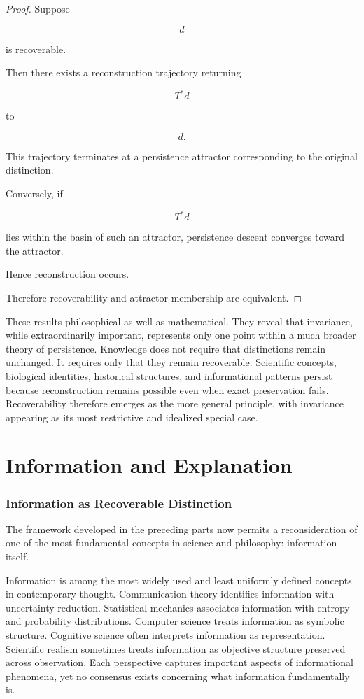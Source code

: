 \documentclass[12pt,oneside]{article}
\theoremstyle{definition}
\begin{document}
\begin{proof}

Suppose

\[
d
\]

is recoverable.

Then there exists a reconstruction trajectory returning

\[
T^*d
\]

to

\[
d.
\]

This trajectory terminates at a persistence attractor corresponding to the original distinction.

Conversely, if

\[
T^*d
\]

lies within the basin of such an attractor, persistence descent converges toward the attractor.

Hence reconstruction occurs.

Therefore recoverability and attractor membership are equivalent.

\end{proof}

These results philosophical as well as mathematical. They reveal that invariance, while extraordinarily important, represents only one point within a much broader theory of persistence. Knowledge does not require that distinctions remain unchanged. It requires only that they remain recoverable. Scientific concepts, biological identities, historical structures, and informational patterns persist because reconstruction remains possible even when exact preservation fails. Recoverability therefore emerges as the more general principle, with invariance appearing as its most restrictive and idealized special case.

\part{Information and Explanation}

\section{Information as Recoverable Distinction}

The framework developed in the preceding parts now permits a reconsideration of one of the most fundamental concepts in science and philosophy: information itself.

Information is among the most widely used and least uniformly defined concepts in contemporary thought. Communication theory identifies information with uncertainty reduction. Statistical mechanics associates information with entropy and probability distributions. Computer science treats information as symbolic structure. Cognitive science often interprets information as representation. Scientific realism sometimes treats information as objective structure preserved across observation. Each perspective captures important aspects of informational phenomena, yet no consensus exists concerning what information fundamentally is.
\end{document}
